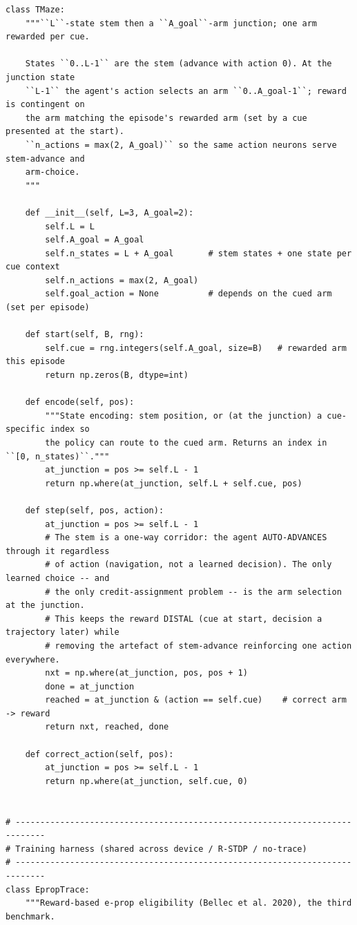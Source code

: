 \begin{lstlisting}[caption={mrl\_trace/maze.py},label={lst:siox-src-maze}]
class TMaze:
    """``L``-state stem then a ``A_goal``-arm junction; one arm rewarded per cue.

    States ``0..L-1`` are the stem (advance with action 0). At the junction state
    ``L-1`` the agent's action selects an arm ``0..A_goal-1``; reward is contingent on
    the arm matching the episode's rewarded arm (set by a cue presented at the start).
    ``n_actions = max(2, A_goal)`` so the same action neurons serve stem-advance and
    arm-choice.
    """

    def __init__(self, L=3, A_goal=2):
        self.L = L
        self.A_goal = A_goal
        self.n_states = L + A_goal       # stem states + one state per cue context
        self.n_actions = max(2, A_goal)
        self.goal_action = None          # depends on the cued arm (set per episode)

    def start(self, B, rng):
        self.cue = rng.integers(self.A_goal, size=B)   # rewarded arm this episode
        return np.zeros(B, dtype=int)

    def encode(self, pos):
        """State encoding: stem position, or (at the junction) a cue-specific index so
        the policy can route to the cued arm. Returns an index in ``[0, n_states)``."""
        at_junction = pos >= self.L - 1
        return np.where(at_junction, self.L + self.cue, pos)

    def step(self, pos, action):
        at_junction = pos >= self.L - 1
        # The stem is a one-way corridor: the agent AUTO-ADVANCES through it regardless
        # of action (navigation, not a learned decision). The only learned choice -- and
        # the only credit-assignment problem -- is the arm selection at the junction.
        # This keeps the reward DISTAL (cue at start, decision a trajectory later) while
        # removing the artefact of stem-advance reinforcing one action everywhere.
        nxt = np.where(at_junction, pos, pos + 1)
        done = at_junction
        reached = at_junction & (action == self.cue)    # correct arm -> reward
        return nxt, reached, done

    def correct_action(self, pos):
        at_junction = pos >= self.L - 1
        return np.where(at_junction, self.cue, 0)


# ----------------------------------------------------------------------------
# Training harness (shared across device / R-STDP / no-trace)
# ----------------------------------------------------------------------------
class EpropTrace:
    """Reward-based e-prop eligibility (Bellec et al. 2020), the third benchmark.


\end{lstlisting}

